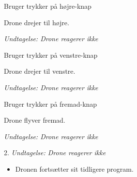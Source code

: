 \documentclass[Main]{subfiles}
\begin{document}
\begin{UseCase}
	\begin{normFor}
	\item Bruger trykker på højre-knap
	\item Drone drejer til højre.
	\item[] \textit{Undtagelse: Drone reagerer ikke}
	\end{normFor} 
	
	\begin{normFor}
	\item Bruger trykker på venstre-knap
	\item Drone drejer til venstre.
	\item[] \textit{Undtagelse: Drone reagerer ikke}
	\end{normFor} 
	
	\begin{normFor}
	\item Bruger trykker på fremad-knap
	\item Drone flyver fremad.
	\item[] \textit{Undtagelse: Drone reagerer ikke}
	\end{normFor} 

	\begin{normFor}
	\item[2.] \textit{Undtagelse: Drone reagerer ikke}
		\begin{itemize}
		\item Dronen fortsætter sit tidligere program.
		\end{itemize}
	\end{normFor} 
	
\end{UseCase}
\end{document}
